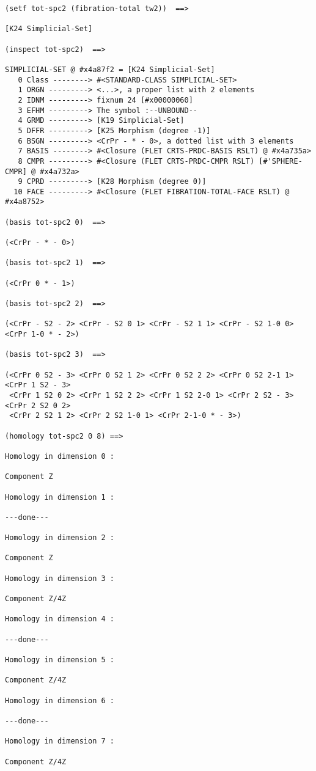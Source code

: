 {\footnotesize\begin{verbatim}
(setf tot-spc2 (fibration-total tw2))  ==>

[K24 Simplicial-Set]

(inspect tot-spc2)  ==>

SIMPLICIAL-SET @ #x4a87f2 = [K24 Simplicial-Set]
   0 Class --------> #<STANDARD-CLASS SIMPLICIAL-SET>
   1 ORGN ---------> <...>, a proper list with 2 elements
   2 IDNM ---------> fixnum 24 [#x00000060]
   3 EFHM ---------> The symbol :--UNBOUND--
   4 GRMD ---------> [K19 Simplicial-Set]
   5 DFFR ---------> [K25 Morphism (degree -1)]
   6 BSGN ---------> <CrPr - * - 0>, a dotted list with 3 elements
   7 BASIS --------> #<Closure (FLET CRTS-PRDC-BASIS RSLT) @ #x4a735a>
   8 CMPR ---------> #<Closure (FLET CRTS-PRDC-CMPR RSLT) [#'SPHERE-CMPR] @ #x4a732a>
   9 CPRD ---------> [K28 Morphism (degree 0)]
  10 FACE ---------> #<Closure (FLET FIBRATION-TOTAL-FACE RSLT) @ #x4a8752>

(basis tot-spc2 0)  ==>

(<CrPr - * - 0>)

(basis tot-spc2 1)  ==>

(<CrPr 0 * - 1>)

(basis tot-spc2 2)  ==>

(<CrPr - S2 - 2> <CrPr - S2 0 1> <CrPr - S2 1 1> <CrPr - S2 1-0 0> <CrPr 1-0 * - 2>)

(basis tot-spc2 3)  ==>

(<CrPr 0 S2 - 3> <CrPr 0 S2 1 2> <CrPr 0 S2 2 2> <CrPr 0 S2 2-1 1> <CrPr 1 S2 - 3>
 <CrPr 1 S2 0 2> <CrPr 1 S2 2 2> <CrPr 1 S2 2-0 1> <CrPr 2 S2 - 3> <CrPr 2 S2 0 2>
 <CrPr 2 S2 1 2> <CrPr 2 S2 1-0 1> <CrPr 2-1-0 * - 3>)

(homology tot-spc2 0 8) ==>

Homology in dimension 0 :

Component Z

Homology in dimension 1 :

---done---

Homology in dimension 2 :

Component Z

Homology in dimension 3 :

Component Z/4Z

Homology in dimension 4 :

---done---

Homology in dimension 5 :

Component Z/4Z

Homology in dimension 6 :

---done---

Homology in dimension 7 :

Component Z/4Z
\end{verbatim}}
